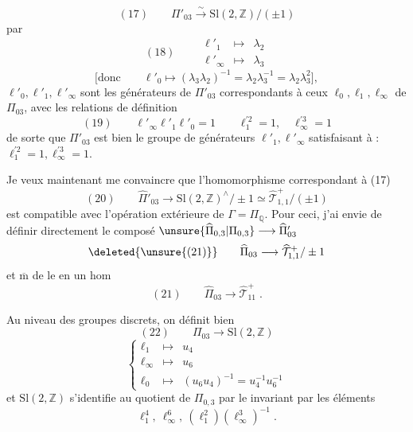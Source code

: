 \[
(17)\qquad \Pi'_{03}\xrightarrow{\sim}\mathrm{Sl}(2,\mathbb Z)/(\pm1)
\]
par
\[
(18)\qquad
\begin{array}{rcl}
\ell'_1&\longmapsto&\lambda_2\\
\ell'_\infty&\longmapsto&\lambda_3
\end{array}
\]
\[
\bigl[\text{donc}\qquad\ell'_0\longmapsto(\lambda_3\lambda_2)^{-1}
=\lambda_2\lambda_3^{-1}=\lambda_2\lambda_3^2\bigr],
\]
 $\ell'_0,\ell'_1,\ell'_\infty$ sont les générateurs de $\Pi'_{03}$ correspondants à ceux $\ell_0,\ell_1,\ell_\infty$ de $\Pi_{03}$, avec les relations de définition
\[
(19)\qquad\ell'_\infty\ell'_1\ell'_0=1\qquad
\ell_1^{\prime 2}=1,\quad\ell_\infty^{\prime 3}=1
\]
de sorte que $\Pi'_{03}$ est bien le groupe  de générateurs $\ell'_1,\ell'_\infty$ satisfaisant à : $\ell_1^{\prime 2}=1,\ell_\infty^{\prime 3}=1$.

Je veux maintenant me convaincre que l'homomorphisme correspondant à (17)
\[
(20)\qquad\widehat{\Pi}'_{03}\longrightarrow
\mathrm{Sl}(2,\mathbb Z)^\wedge/\pm1\simeq
\widehat{\mathcal T}_{1,1}^{+}/(\pm1)
\]
est compatible avec l'opération extérieure de $\Gamma=\Pi_{\mathbb Q}$. Pour ceci, j'ai envie de définir directement le composé  $\unsure{\widehat{\Pi}_{0,3}|\Pi_{0,3}}\longrightarrow\widehat{\Pi}'_{03}$
\[
\text{\deleted{\unsure{(21)}}}\qquad\widehat{\Pi}_{03}\longrightarrow\widehat{\mathcal T}_{1,1}^{+}/\pm1
\]
et $\overline{\mathrm m}$ de le  en un hom
\[
(21)\qquad\widehat{\Pi}_{03}\longrightarrow\widehat{\mathcal T}_{11}^{+}\;.
\]

Au niveau des groupes discrets, on définit bien
\[
(22)\qquad\Pi_{03}\longrightarrow\mathrm{Sl}(2,\mathbb Z)
\]
\[
\left\{
\begin{array}{rcl}
\ell_1&\longmapsto&u_4\\
\ell_\infty&\longmapsto&u_6\\
\ell_0&\longmapsto&(u_6u_4)^{-1}=u_4^{-1}u_6^{-1}
\end{array}
\right.
\]
et $\mathrm{Sl}(2,\mathbb Z)$ s'identifie au quotient de $\Pi_{0,3}$ par le  invariant  par les éléments
\[
\ell_1^4,\ \ell_\infty^6,\ (\ell_1^2)(\ell_\infty^3)^{-1}\;.
\]

